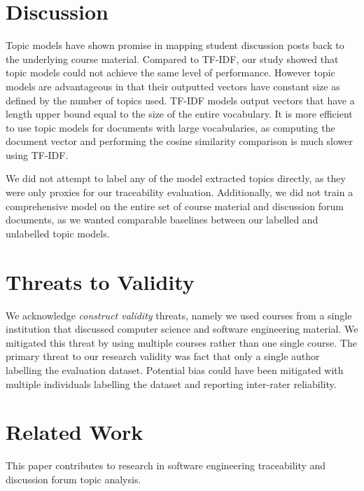 \documentclass[sigconf, anonymous]{acmart}
\begin{document}
\section{Discussion}
Topic models have shown promise in mapping student discussion posts back to the underlying course material.
Compared to TF-IDF, our study showed that topic models could not achieve the same level of performance.
However topic models are advantageous in that their outputted vectors have constant size as defined by the number of topics used.
TF-IDF models output vectors that have a length upper bound equal to the size of the entire vocabulary.
It is more efficient to use topic models for documents with large vocabularies, as computing the document vector and performing the cosine similarity comparison is much slower using TF-IDF.

We did not attempt to label any of the model extracted topics directly, as they were only proxies for our traceability evaluation.
Additionally, we did not train a comprehensive model on the entire set of course material and discussion forum documents, as we wanted comparable baselines between our labelled and unlabelled topic models.

\section{Threats to Validity}
We acknowledge \textit{construct validity} threats, namely we used courses from a single institution that discussed computer science and software engineering material. We mitigated this threat by using multiple courses rather than one single course.
The primary threat to our research validity was fact that only a single author labelling the evaluation dataset.
Potential bias could have been mitigated with multiple individuals labelling the dataset and reporting inter-rater reliability.

\section{Related Work}
This paper contributes to research in software engineering traceability and discussion forum topic analysis.
\end{document}

